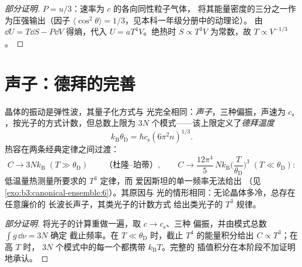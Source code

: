 \begin{proof}[部分证明]
$P = u/3$：速率为 $c$ 的各向同性粒子气体，
将其能量密度的三分之一作为压强输出（因子 $\langle
\cos^2\theta\rangle = 1/3$，见本科一年级分册中的动理论）。
由 $\dd U = T\dd S - P\dd V$ 得熵，代入 $U =
aT^4V$。绝热时 $S \propto T^3V$ 为常数，故 $T \propto
V^{-1/3}$。
\end{proof}

\section{声子：德拜的完善}

\begin{theorem}[德拜模型]\label{thm:b3:photons-phonons:debye}
晶体的振动是弹性波，其量子化方式与
光完全相同：\emph{声子}，三种偏振，声速为
$c_{\text{s}}$，按光子的方式计数，但总数上限为
$3N$ 个模式——该上限定义了\emph{德拜温度}
\[
k_{\text{B}}\theta_{\text{D}} = \hbar c_{\text{s}}
(6\pi^2n)^{1/3} .
\]
热容在两条经典定律之间过渡：
\[
C \to 3Nk_{\text{B}} \;(T \gg \theta_{\text{D}})
\qquad\text{（杜隆–珀蒂）} ,
\qquad
C \to \frac{12\pi^4}{5}\,Nk_{\text{B}}
\Big(\frac{T}{\theta_{\text{D}}}\Big)^3
\;(T \ll \theta_{\text{D}}) :
\]
低温量热测量所要求的 $T^3$ 定律，而
爱因斯坦的单一频率无法给出
（见\cref{exo:b3:canonical-ensemble:6}）。其原因与
光的情形相同：无论晶体多冷，总存在任意廉价的
长波长声子，其类光子的计数方式
给出类光子的 $T^3$ 规律。
\end{theorem}

\begin{proof}[部分证明]
将光子的计算重做一遍，取 $c \to c_{\text{s}}$、三种
偏振，并由模式总数 $\int g\,\dd\nu = 3N$ 确定
截止频率。在 $T \ll \theta_{\text{D}}$ 时，截止
$T^4$ 的能量积分给出 $C \propto T^3$；在高 $T$ 时，
$3N$ 个模式中的每一个都携带 $k_{\text{B}}T$。完整的
插值积分在本阶段不加证明地承认。
\end{proof}

